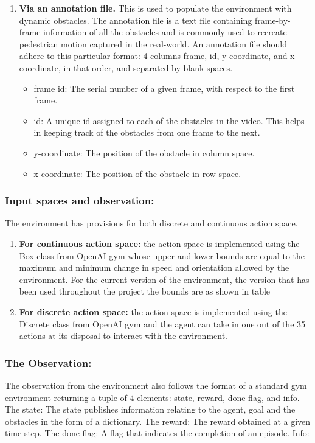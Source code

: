 \begin{enumerate}
\item \textbf{Via an annotation file.}
This is used to populate the environment with dynamic obstacles. The annotation file is a text file containing frame-by-frame information of all the obstacles and is commonly used to recreate pedestrian motion captured in the real-world. An annotation file should adhere to this particular format: 4 columns frame, id, y-coordinate, and x-coordinate, in that order, and separated by blank spaces.
\begin{itemize}
	\item frame id: The serial number of a given frame, with respect to the first frame.
	\item id: A unique id assigned to each of the obstacles in the video. This helps in keeping track of the obstacles from one frame to the next.
	\item y-coordinate: The position of the obstacle in column space.
	\item x-coordinate: The position of the obstacle in row space.
\end{itemize}
\end{enumerate}
\subsubsection*{Input spaces and observation:}
The environment has provisions for both discrete and continuous action space.
\begin{enumerate}
	\item \textbf{For continuous action space:} the action space is implemented using the Box class from OpenAI gym whose upper and lower bounds are equal to the maximum and minimum change in speed and orientation allowed by the environment. For the current version of the environment, the version that has been used throughout the project the bounds are as shown in table 
	\item \textbf{For discrete action space:} the action space is implemented using the Discrete class from OpenAI gym and the agent can take in one out of the 35 actions at its disposal to interact with the environment.
\end{enumerate}
\subsubsection*{The Observation:}
The observation from the environment also follows the format of a standard gym environment returning a tuple of 4 elements: state, reward, done-flag, and info.
The state:
The state publishes information relating to the agent, goal and the obstacles in the form of a dictionary.
The reward:
The reward obtained at a given time step.
The done-flag:
A flag that indicates the completion of an episode.
Info:
